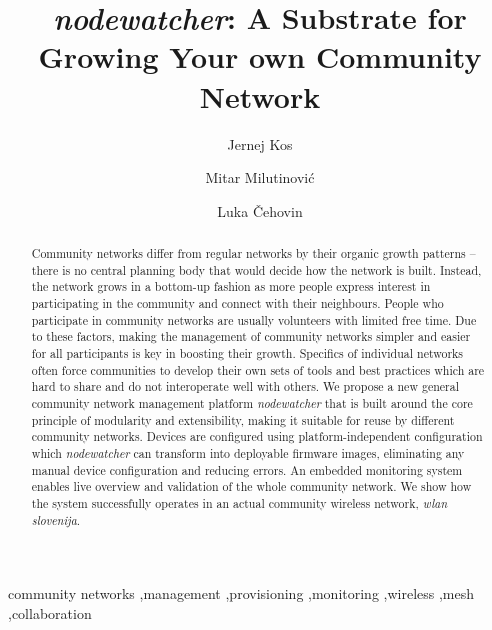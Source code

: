\documentclass[5p,sort&compress]{elsarticle}
\newcommand{\nodewatcher}{\textit{nodewatcher}}
\newcommand{\wlanslovenija}{\textit{wlan slovenija}}
\begin{document}
\begin{frontmatter}
\title{\nodewatcher{}: A Substrate for Growing Your own Community Network}

\author[fri,wlansi]{Jernej Kos}

\author[berkeley,wlansi]{Mitar Milutinović}

\author[fri,wlansi]{Luka Čehovin}


\address[fri]{University of Ljubljana, Faculty of Computer and Information Science, Ljubljana, Slovenia}

\address[berkeley]{University of California, Berkeley, USA}

\address[wlansi]{\wlanslovenija{}, Open wireless network of Slovenia, \url{https://wlan-si.net}}

\begin{abstract}
Community networks differ from regular networks by their organic growth patterns -- there is no central planning body that would decide how the network is built.
Instead, the network grows in a bottom-up fashion as more people express interest in participating in the community and connect with their neighbours.
People who participate in community networks are usually volunteers with limited free time.
Due to these factors, making the management of community networks simpler and easier for all participants is key in boosting their growth.
Specifics of individual networks often force communities to develop their own sets of tools and best practices which are hard to share and do not interoperate well with others.
We propose a new general community network management platform \nodewatcher{} that is built around the core principle of modularity and extensibility, making it suitable for reuse by different community networks.
Devices are configured using platform-independent configuration which \nodewatcher{} can transform into deployable firmware images, eliminating any manual device configuration and reducing errors.
An embedded monitoring system enables live overview and validation of the whole community network.
We show how the system successfully operates in an actual community wireless network, \wlanslovenija{}.
\end{abstract}

\begin{keyword}
community networks \sep management \sep provisioning \sep monitoring \sep wireless \sep mesh \sep collaboration
\end{keyword}
\end{frontmatter}
\end{document}
